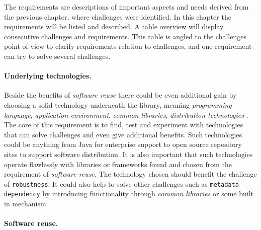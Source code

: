 

The requirements are descriptions of important aspects and needs derived from the previous chapter, 
 where challenges were identified.
In this chapter the requirements will be listed and described. A table overview will display
consecutive challenges and requirements. 
This table is angled to the challenges point of view to clarify requirements relation to challenges,
and one requirement can try to solve several challenges.

\paragraph{Underlying technologies.}

Beside the benefits of \emph{software reuse} there could be even additional gain by choosing
a solid technology underneath the library, meaning \emph{programming language},
\emph{application environment}, \emph{common libraries}, \emph{distribution technologies} \etc.
The core of this requirement is to find, test and experiment with technologies that can solve
challenges and even give additional benefits.
Such technologies could be anything from Java for enterprise support to open source repository
sites to support software distribution.
It is also important that such technologies operate flawlessly with libraries or frameworks
found and chosen from the requirement of \emph{software reuse}.
The technology chosen should benefit the challenge of \texttt{robustness}.
It could also help to solve other challenges such as \texttt{metadata dependency} by introducing
functionality through \emph{common libraries} or some built in mechanism.

\paragraph{Software reuse.}

